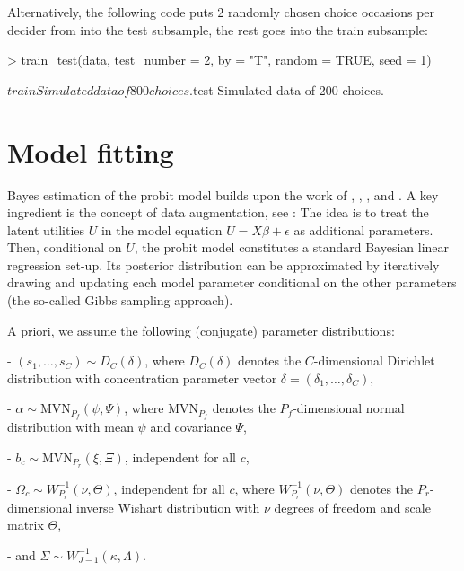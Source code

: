 \documentclass[article]{jss}
\begin{document}
Alternatively, the following code puts 2 randomly chosen choice occasions per decider from  into the test subsample, the rest goes into the train subsample:

\begin{Schunk}
\begin{Sinput}
> train_test(data, test_number = 2, by = "T", random = TRUE, seed = 1)
\end{Sinput}
\begin{Soutput}
$train
Simulated data of 800 choices.

$test
Simulated data of 200 choices.
\end{Soutput}
\end{Schunk}

\section{Model fitting} \label{sec:model_fitting}

Bayes estimation of the probit model builds upon the work of \cite{McCulloch:1994}, \cite{Nobile:1998}, \cite{Allenby:1998}, and \cite{Imai:2005}. A key ingredient is the concept of data augmentation, see \cite{Albert:1993}: The idea is to treat the latent utilities $U$ in the model equation $U = X\beta + \epsilon$ as additional parameters. Then, conditional on $U$, the probit model constitutes a standard Bayesian linear regression set-up. Its posterior distribution can be approximated by iteratively drawing and updating each model parameter conditional on the other parameters (the so-called Gibbs sampling approach).

A priori, we assume the following (conjugate) parameter distributions:

- $(s_1,\dots,s_C)\sim D_C(\delta)$, where $D_C(\delta)$ denotes the $C$-dimensional Dirichlet distribution with concentration parameter vector $\delta = (\delta_1,\dots,\delta_C)$,

- $\alpha\sim \text{MVN}_{P_f}(\psi,\Psi)$, where $\text{MVN}_{P_f}$ denotes the $P_f$-dimensional normal distribution with mean $\psi$ and covariance $\Psi$,

- $b_c \sim \text{MVN}_{P_r}(\xi,\Xi)$, independent for all $c$,

- $\Omega_c \sim W^{-1}_{P_r}(\nu,\Theta)$, independent for all $c$, where $W^{-1}_{P_r}(\nu,\Theta)$ denotes the $P_r$-dimensional inverse Wishart distribution with $\nu$ degrees of freedom and scale matrix $\Theta$,

- and $\Sigma \sim W^{-1}_{J-1}(\kappa,\Lambda)$.
\end{document}
